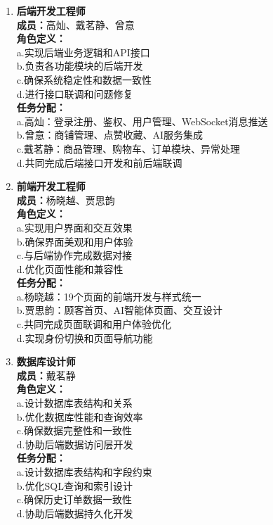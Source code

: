 \begin{enumerate}
    \item \textbf{后端开发工程师} \\
          \textbf{成员：}高灿、戴茗静、曾意 \\
          \textbf{角色定义：}  \\
          a.实现后端业务逻辑和API接口  \\
          b.负责各功能模块的后端开发  \\
          c.确保系统稳定性和数据一致性  \\
          d.进行接口联调和问题修复  \\
          \textbf{任务分配：}  \\
          a.高灿：登录注册、鉴权、用户管理、WebSocket消息推送  \\
          b.曾意：商铺管理、点赞收藏、AI服务集成  \\
          c.戴茗静：商品管理、购物车、订单模块、异常处理  \\
          d.共同完成后端接口开发和前后端联调  \\

    \item \textbf{前端开发工程师} \\
          \textbf{成员：}杨晓越、贾思韵 \\
          \textbf{角色定义：}  \\
          a.实现用户界面和交互效果  \\
          b.确保界面美观和用户体验  \\
          c.与后端协作完成数据对接  \\
          d.优化页面性能和兼容性  \\
          \textbf{任务分配：}  \\
          a.杨晓越：19个页面的前端开发与样式统一  \\
          b.贾思韵：顾客首页、AI智能体页面、交互设计  \\
          c.共同完成页面联调和用户体验优化  \\
          d.实现身份切换和页面导航功能  \\

    \item \textbf{数据库设计师} \\
          \textbf{成员：}戴茗静 \\
          \textbf{角色定义：}  \\
          a.设计数据库表结构和关系  \\
          b.优化数据库性能和查询效率  \\
          c.确保数据完整性和一致性  \\
          d.协助后端数据访问层开发  \\
          \textbf{任务分配：}  \\
          a.设计数据库表结构和字段约束  \\
          b.优化SQL查询和索引设计  \\
          c.确保历史订单数据一致性  \\
          d.协助后端数据持久化开发  \\


\end{enumerate}
